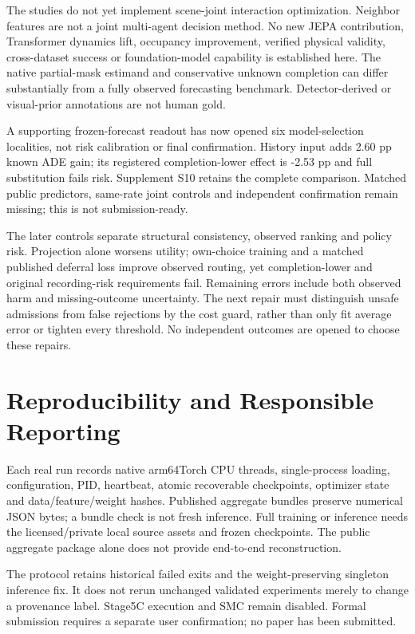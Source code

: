 \documentclass[10pt,twocolumn,letterpaper]{article}
\begin{document}
The studies do not yet implement scene-joint interaction optimization. Neighbor
features are not a joint multi-agent decision method. No new JEPA contribution,
Transformer dynamics lift, occupancy improvement, verified physical validity,
cross-dataset success or foundation-model capability is established here.
The native partial-mask estimand and conservative unknown completion can differ
substantially from a fully observed forecasting benchmark. Detector-derived
or visual-prior annotations are not human gold.

A supporting frozen-forecast readout has now opened six model-selection localities, not risk calibration or final confirmation. History input adds 2.60 pp known ADE gain; its registered completion-lower effect is -2.53 pp and full substitution fails risk. Supplement S10 retains the complete comparison. Matched public predictors, same-rate joint controls and independent confirmation remain missing; this is not submission-ready.

The later controls separate structural consistency, observed ranking and policy risk. Projection alone worsens utility; own-choice training and a matched published deferral loss improve observed routing, yet completion-lower and original recording-risk requirements fail. Remaining errors include both observed harm and missing-outcome uncertainty. The next repair must distinguish unsafe admissions from false rejections by the cost guard, rather than only fit average error or tighten every threshold. No independent outcomes are opened to choose these repairs.

\section{Reproducibility and Responsible Reporting}
Each real run records native arm64Torch CPU threads, single-process loading,
configuration, PID, heartbeat, atomic recoverable checkpoints, optimizer state
and data/feature/weight hashes. Published aggregate bundles preserve numerical
JSON bytes; a bundle check is not fresh inference. Full training or inference
needs the licensed/private local source assets and frozen checkpoints. The
public aggregate package alone does not provide end-to-end reconstruction.

The protocol retains historical failed exits and the weight-preserving singleton
inference fix. It does not rerun unchanged validated experiments merely to
change a provenance label. Stage5C execution and SMC remain disabled. Formal
submission requires a separate user confirmation; no paper has been submitted.
\end{document}
